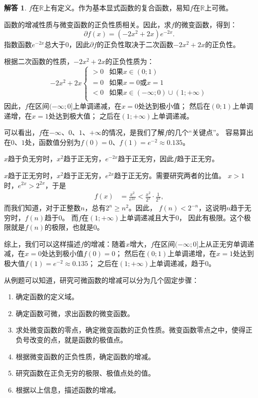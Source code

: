 \documentclass[12pt,UTF8]{ctexbook}
\theoremstyle{definition}
\newtheorem*{so}{解答}
\theoremstyle{plain}
\begin{document}
\begin{so}
    $f$在$\mathbb{R}$上有定义。作为基本显式函数的复合函数，易知$f$在$\mathbb{R}$上可微。

    函数的增减性质与微变函数的正负性质相关。因此，求$f$的微变函数，得到：
    $$ \partial f(x) = (-2x^2 + 2x) e^{-2x}.$$
    指数函数$ e^{-2x} $总大于$0$，因此$ \partial f $的正负性取决于二次函数$-2x^2 + 2x$的正负性。
    
    根据二次函数的性质，$-2x^2 + 2x$的正负性质为：
    $$ -2x^2 + 2x \left\{
        \begin{array}{cl}
            > 0 & \mbox{如果}x \in (0; 1) \\
            = 0 & \mbox{如果}x = 0 \mbox{或} x = 1 \\
            < 0 & \mbox{如果}x \in (-\infty; 0)\cup (1; +\infty)\\
        \end{array}\right.
    $$
    因此，$f$在区间$(-\infty; 0]$上单调递减，在$x = 0$处达到极小值；
    然后在$(0; 1)$上单调递增，在$x = 1$处达到极大值；
    之后在$(1; +\infty)$上单调递减。

    可以看出，$f$在$-\infty$、$0$、$1$、$+\infty$的情况，是我们了解$f$的几个“关键点”。
    容易算出在$0$、$1$处，函数值分别为$f(0) = 0$、$f(1) = e^{-2} \approx 0.135$。
    
    $x$趋于负无穷时，$x^2$趋于正无穷，$e^{-2x}$趋于正无穷，因此$f$趋于正无穷。

    $x$趋于正无穷时，$x^2$趋于正无穷，$e^{2x}$趋于正无穷。需要研究两者的比值。
    $x > 1$时，$e^{2x} > 2^{2x}$，于是
    \begin{align*}
        f(x) &= \frac{x^2}{e^{2x}} < \frac{x^2}{2^x} \cdot \frac{1}{2^x}, 
    \end{align*} 
    而我们知道，对于正整数$n$，总有$2^n \geqslant n^2$。因此，
    $f(n) < 2^{-n}$，这说明$n$趋于无穷时，$f(n)$趋于$0$。
    而$f$在$(1;+\infty)$上单调递减且大于$0$，
    因此有极限。这个极限就是$f(n)$的极限，也就是$0$。

    综上，我们可以这样描述$f$的增减：随着$x$增大，$f$在区间$(-\infty; 0]$上从正无穷单调递减，在$x = 0$处达到极小值$f(0) = 0$；
    然后在$(0; 1)$上单调递增，在$x = 1$处达到极大值$f(1) = e^{-2} \approx 0.135$；
    之后在$(1; +\infty)$上单调递减，趋于$0$。
\end{so}

从例题可以知道，研究可微函数的增减可以分为几个固定步骤：
\begin{enumerate}
    \item 确定函数的定义域。
    \item 确定函数可微，求出函数的微变函数。
    \item 求处微变函数的零点，确定微变函数的正负性质。微变函数零点之中，使得正负号改变的点，就是函数的极值点。
    \item 根据微变函数的正负性质，确定函数的增减。
    \item 研究函数在正负无穷的极限、极值点处的值。
    \item 根据以上信息，描述函数的增减。
\end{enumerate}
\end{document}
